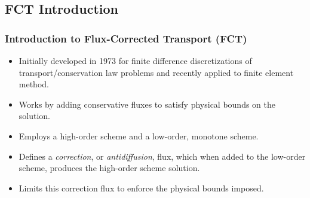 \documentclass{beamer} \useoutertheme{infolines}
\begin{document}
\subsection{FCT Introduction}
\begin{frame}
\frametitle{Introduction to Flux-Corrected Transport (FCT)}

\begin{itemize}
   \item Initially developed in 1973 for finite difference discretizations of
      transport/conservation law problems and recently applied to finite element
      method.
   \item Works by adding conservative fluxes to satisfy physical bounds on the
      solution.
   \item Employs a high-order scheme and a low-order, monotone scheme.
   \item Defines a \emph{correction}, or \emph{antidiffusion}, flux, which
      when added to the low-order scheme, produces the high-order scheme
      solution.
   \item Limits this correction flux to enforce the physical bounds imposed.
\end{itemize}

\end{frame}
\end{document}
